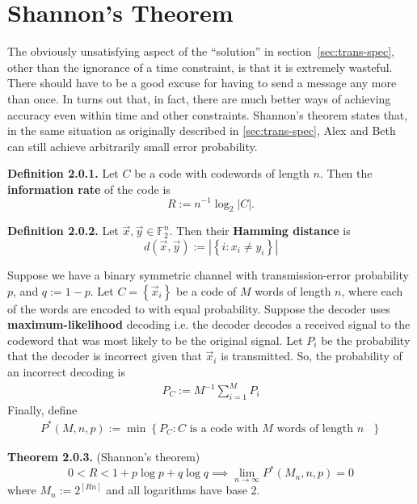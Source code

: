 \documentclass{article}
\renewcommand{\tt}[1]{\text{ #1 }}
\newcommand{\F}{\mathbb{F}}
\renewcommand{\=}{\equiv}
\renewcommand{\i}{^{-1}}
\newcommand{\ra}{\rightarrow}
\newcommand{\set}[1]{\left\{ #1 \right\}}
\renewcommand{\v}{\vec}
\newcommand{\x}{{\v x}}
\newcommand{\y}{{\v y}}
\newcommand{\definition}[1]{\vspace{1em}\noindent\textbf{Definition #1.} }
\newcommand{\theorem}[1]{\vspace{1em}\noindent\textbf{Theorem #1.} }
\begin{document}
\section{Shannon's Theorem}

The obviously unsatisfying aspect of the ``solution'' in section~\ref{sec:trans-spec}, other than the ignorance of a time constraint, is that it is extremely wasteful. There should have to be a good excuse for having to send a message any more than once.
In turns out that, in fact, there are much better ways of achieving accuracy even within time and other constraints.
Shannon's theorem states that, in the same situation as originally described in \ref{sec:trans-spec}, Alex and Beth can still achieve arbitrarily small error probability.

\definition{2.0.1} \label{eq:defR}
Let $C$ be a code with codewords of length $n$. Then the \textbf{information rate} of the code is
$$ R := n\i \log_2 |C|. $$

\definition{2.0.2}
Let $\x, \y \in \F_2^n$. Then their \textbf{Hamming distance} is
$$ d(\x, \y) := |\set{ i : x_i \neq y_i }| $$

Suppose we have a binary symmetric channel with transmission-error probability $p$, and $q := 1 - p$.
Let $C = \set{ \x_i }$ be a code of $M$ words of length $n$, where each of the words are encoded to with equal probability.
Suppose the decoder uses \textbf{maximum-likelihood} decoding i.e. the decoder decodes a received signal to the codeword that was most likely to be the original signal.
Let $P_i$ be the probability that the decoder is incorrect given that $\x_i$ is transmitted.
So, the probability of an incorrect decoding is
\begin{align}
  P_C := M\i \sum_{i=1}^M P_i
\end{align}
Finally, define
\begin{align}
  P^*(M, n, p) := \min\set{ P_C : C \tt{is a code with $M$ words of length $n$} }
\end{align}

\theorem{2.0.3}
(Shannon's theorem)
$$
0 < R < 1 + p \log p + q \log q
\implies \lim_{n \ra \infty} P^*(M_n, n, p) = 0
$$
where $M_n := 2^{[Rn]}$ and all logarithms have base 2.
\end{document}
